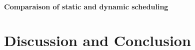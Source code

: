 \documentclass{sig-alternate}
\begin{document}
\paragraph{Comparaison of static and dynamic scheduling} %

\section{Discussion and Conclusion}


%

%
%
\end{document}
